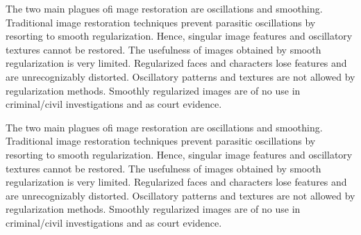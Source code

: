 \begin{enabstract}
The two main plagues ofi mage restoration are oscillations
and smoothing. Traditional image restoration techniques
prevent parasitic oscillations by resorting to smooth regularization.
Hence, singular image features and oscillatory
textures cannot be restored. The usefulness of images obtained
by smooth regularization is very limited. Regularized
faces and characters lose features and are unrecognizably
distorted. Oscillatory patterns and textures are not
allowed by regularization methods. Smoothly regularized
images are of no use in criminal/civil investigations and as
court evidence.

The two main plagues ofi mage restoration are oscillations
and smoothing. Traditional image restoration techniques
prevent parasitic oscillations by resorting to smooth regularization.
Hence, singular image features and oscillatory
textures cannot be restored. The usefulness of images obtained
by smooth regularization is very limited. Regularized
faces and characters lose features and are unrecognizably
distorted. Oscillatory patterns and textures are not
allowed by regularization methods. Smoothly regularized
images are of no use in criminal/civil investigations and as
court evidence.
\end{enabstract}
